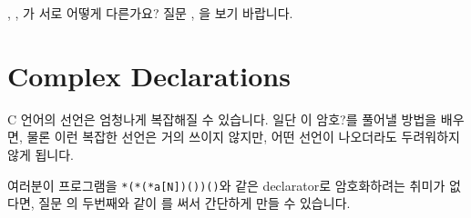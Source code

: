 \begin{faq}
        , , 가
        서로 어떻게 다른가요?
\A
        질문 , 을 보기 바랍니다.
\end{faq}

\section{Complex Declarations}	\label{sec:complexdec}
C 언어의 선언은 엄청나게 복잡해질 수 있습니다.
일단 이 암호?를 풀어낼 방법을 배우면, 물론 이런 복잡한 선언은 거의 쓰이지
않지만, 어떤 선언이 나오더라도 두려워하지 않게 됩니다.

여러분이 프로그램을 \verb+*(*(*a[N])())()+와 같은 declarator로
암호화하려는 취미가 없다면, 질문 의 두번째와 같이 를 써서
간단하게 만들 수 있습니다.


